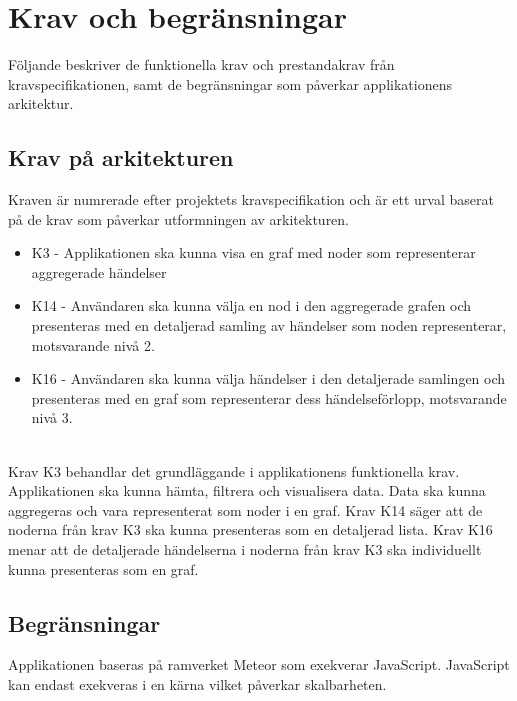 \section{Krav och begränsningar}
Följande beskriver de funktionella krav och prestandakrav från kravspecifikationen, samt de begränsningar som påverkar applikationens arkitektur.
\subsection{Krav på arkitekturen}
Kraven är numrerade efter projektets kravspecifikation och är ett urval baserat på de krav som påverkar utformningen av arkitekturen.
\begin{itemize}
  \item K3 - Applikationen ska kunna visa en graf med noder som representerar aggregerade händelser
  \item K14 - Användaren ska kunna välja en nod i den aggregerade grafen och presenteras med en detaljerad samling av händelser som noden representerar, motsvarande nivå 2.
  \item K16 - Användaren ska kunna välja händelser i den detaljerade samlingen och presenteras med en graf som representerar dess händelseförlopp, motsvarande nivå 3.
\end{itemize}
\ \\
Krav K3 behandlar det grundläggande i applikationens funktionella krav. Applikationen ska kunna hämta, filtrera och visualisera data. Data ska kunna aggregeras och vara representerat som noder i en graf. Krav K14 säger att de noderna från krav K3 ska kunna presenteras som en detaljerad lista. Krav K16 menar att de detaljerade händelserna i noderna från krav K3 ska individuellt kunna presenteras som en graf.
\subsection{Begränsningar}
Applikationen baseras på ramverket Meteor som exekverar JavaScript. JavaScript kan endast exekveras i en kärna vilket påverkar skalbarheten.\cite{javascriptsinglethread}